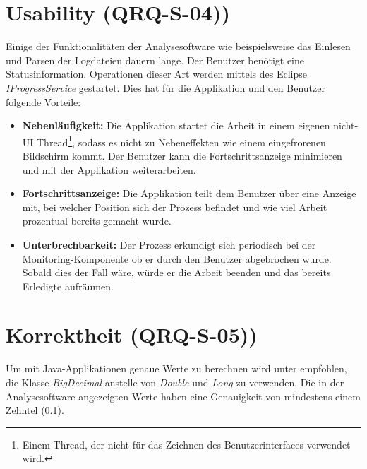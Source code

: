 \section{Usability (QRQ-S-04))}
Einige der Funktionalitäten der Analysesoftware wie beispielsweise das Einlesen und Parsen der Logdateien dauern lange. Der Benutzer benötigt eine Statusinformation. Operationen dieser Art werden mittels des Eclipse \textit{IProgressService} gestartet. Dies hat für die Applikation und den Benutzer folgende Vorteile:
\begin{itemize}
	\item \textbf{Nebenläufigkeit:} Die Applikation startet die Arbeit in einem eigenen nicht-UI Thread\footnote{Einem Thread, der nicht für das Zeichnen des Benutzerinterfaces verwendet wird.}, sodass es nicht zu Nebeneffekten wie einem eingefrorenen Bildschirm kommt. Der Benutzer kann die Fortschrittsanzeige minimieren und mit der Applikation weiterarbeiten.
	\item \textbf{Fortschrittsanzeige: } Die Applikation teilt dem Benutzer über eine Anzeige mit, bei welcher Position sich der Prozess befindet und wie viel Arbeit prozentual bereits gemacht wurde.
	\item \textbf{Unterbrechbarkeit: } Der Prozess erkundigt sich periodisch bei der Monitoring-Komponente ob er durch den Benutzer abgebrochen wurde. Sobald dies der Fall wäre, würde er die Arbeit beenden und das bereits Erledigte aufräumen.
\end{itemize}


\section{Korrektheit (QRQ-S-05))}
Um mit Java-Applikationen genaue Werte zu berechnen wird unter \cite{bloch2008effective} empfohlen, die Klasse \textit{BigDecimal} anstelle von \textit{Double} und \textit{Long} zu verwenden. Die in der Analysesoftware angezeigten Werte haben eine Genauigkeit von mindestens einem Zehntel (0.1).
